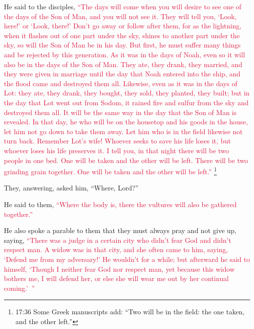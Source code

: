 \myverse{}He said to the disciples,
\textcolor{crimson}{“The days will come when you will desire to see one of the days of the Son of Man, and you will not
	see it.
}
\myverse{}\textcolor{crimson}{They will tell you, ‘Look, here!’ or ‘Look, there!’ Don’t go away or
	follow after them,
}
\myverse{}\textcolor{crimson}{for as the lightning, when it flashes out of one part under the sky,
	shines to another part under the sky, so will the Son of Man be in his day.
}
\myverse{}\textcolor{crimson}{But first, he must suffer many things and be rejected by this generation.
}
\myverse{}\textcolor{crimson}{As it was in the days of Noah, even so it will also be in the days of
	the Son of Man.
}
\myverse{}\textcolor{crimson}{They ate, they drank, they married, and they were given in marriage until
	the day that Noah entered into the ship, and the flood came and destroyed them all.
}
\myverse{}\textcolor{crimson}{Likewise, even as it was in the days of Lot: they ate, they drank, they
	bought, they sold, they planted, they built;
}
\myverse{}\textcolor{crimson}{but in the day that Lot went out from Sodom, it rained fire and sulfur
	from the sky and destroyed them all.
}
\myverse{}\textcolor{crimson}{It will be the same way in the day that the Son of Man is revealed.
}
\myverse{}\textcolor{crimson}{In that day, he who will be on the housetop and his goods in the house,
	let him not go down to take them away. Let him who is in the field likewise not turn back.
}
\myverse{}\textcolor{crimson}{Remember Lot’s wife!
}
\myverse{}\textcolor{crimson}{Whoever seeks to save his life loses it, but whoever loses his life preserves
	it.
}
\myverse{}\textcolor{crimson}{I tell you, in that night there will be two people in one bed. One will
	be taken and the other will be left.
}
\myverse{}\textcolor{crimson}{There will be two grinding grain together. One will be taken and the
	other will be left.”}
\myverse{}\footnote{17:36 Some Greek manuscripts add: “Two will be in the field: the one taken, and the other left.”}

\myverse{}They, answering, asked him, “Where, Lord?”

He said to them,
\textcolor{crimson}{“Where the body is, there the vultures will also be gathered together.”}


\mychapter{} \myverse*{}He also spoke a parable to them that they must always pray and
not give up,
\myverse{}saying,
\textcolor{crimson}{“There was a judge in a certain city who didn’t fear God and didn’t respect man.
}
\myverse{}\textcolor{crimson}{A widow was in that city, and she often came to him, saying, ‘Defend me
	from my adversary!’
}
\myverse{}\textcolor{crimson}{He wouldn’t for a while; but afterward he said to himself, ‘Though I neither
	fear God nor respect man,
}
\myverse{}\textcolor{crimson}{yet because this widow bothers me, I will defend her, or else she will
	wear me out by her continual coming.’ ”}

